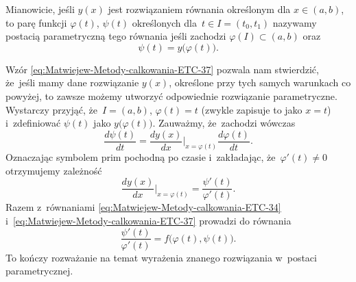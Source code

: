 \documentclass[a4paper,11pt]{article}
\numberwithin{equation}{section}
\begin{document}
Mianowicie, jeśli $y( x )$ jest rozwiązaniem równania określonym dla
$x \in ( a, b )$, to parę funkcji $\varphi( t )$, $\psi( t )$ określonych
dla~$t \in I = ( t_{ 0 }, t_{ 1 } )$ nazywamy postacią parametryczną tego
równania jeśli zachodzi $\varphi( I ) \subset ( a, b )$ oraz
\begin{equation}
  \label{eq:Uwagi-do-konkrentych-stron-18}
  \psi( t ) = y\big( \varphi( t ) \big).
\end{equation}

Wzór \eqref{eq:Matwiejew-Metody-calkowania-ETC-37}
pozwala nam stwierdzić, że~jeśli mamy dane rozwiązanie $y( x )$, określone
przy tych samych warunkach co powyżej, to zawsze możemy utworzyć odpowiednie
rozwiązanie parametryczne. Wystarczy przyjąć, że~$I = ( a, b )$,
$\varphi( t ) = t$ (zwykle zapisuje to jako $x = t$) i~zdefiniować $\psi( t )$ jako
$y\big( \varphi( t ) \big)$. Zauważmy, że~zachodzi wówczas
\begin{equation}
  \label{eq:Uwagi-do-konkrentych-stron-19}
  \frac{ d \psi( t ) }{ d t } =
  \frac{ d y( x ) }{ d x }\bigg|_{ x = \varphi( t ) }
  \frac{ d \varphi( t ) }{ d t }.
\end{equation}
Oznaczając symbolem prim pochodną po czasie i~zakładając,
że~$\varphi'( t ) \neq 0$ otrzymujemy zależność
\begin{equation}
  \label{eq:Uwagi-do-konkrentych-stron-20}
  \frac{ d y( x ) }{ d x }\bigg|_{ x = \varphi( t ) } =
  \frac{ \psi'( t ) }{ \varphi'( t ) }.
\end{equation}
Razem z~równaniami \eqref{eq:Matwiejew-Metody-calkowania-ETC-34}
i~\eqref{eq:Matwiejew-Metody-calkowania-ETC-37} prowadzi do równania
\begin{equation}
  \label{eq:Uwagi-do-konkrentych-stron-21}
  \frac{ \psi'( t ) }{ \varphi'( t ) } =
  f\big( \varphi( t ), \psi( t ) \big).
\end{equation}
To kończy rozważanie na temat wyrażenia znanego rozwiązania w~postaci
parametrycznej.
\end{document}
